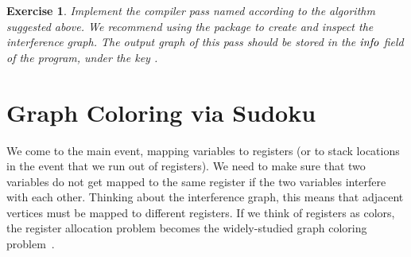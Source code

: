 \documentclass[11pt]{book}
\newcommand{\margincomment}[1]{\marginpar{\color{comment-red}\tiny #1}}
\newcommand{\margincomment}[1]{}
\newtheorem{exercise}[theorem]{Exercise}
\begin{document}

\begin{exercise}\normalfont
Implement the compiler pass named  according
to the algorithm suggested above. We recommend using the 
package to create and inspect the interference graph.  The output
graph of this pass should be stored in the $\mathit{info}$ field of the
program, under the key .
\end{exercise}

  
\section{Graph Coloring via Sudoku}
\label{sec:graph-coloring}

We come to the main event, mapping variables to registers (or to stack
locations in the event that we run out of registers).  We need to make
sure that two variables do not get mapped to the same register if the
two variables interfere with each other.  Thinking about the
interference graph, this means that adjacent vertices must be mapped
to different registers.  If we think of registers as colors, the
register allocation problem becomes the widely-studied graph coloring
problem~\citep{Balakrishnan:1996ve,Rosen:2002bh}.
\end{document}
